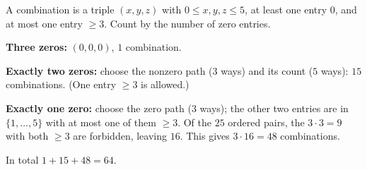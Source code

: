 A combination is a triple $(x,y,z)$ with $0\le x,y,z\le5$, at least one entry $0$, and at most one entry $\ge3$. Count by the number of zero entries.

\textbf{Three zeros:} $(0,0,0)$, $1$ combination.

\textbf{Exactly two zeros:} choose the nonzero path ($3$ ways) and its count ($5$ ways): $15$ combinations. (One entry $\ge3$ is allowed.)

\textbf{Exactly one zero:} choose the zero path ($3$ ways); the other two entries are in $\{1,\dots,5\}$ with at most one of them $\ge3$. Of the $25$ ordered pairs, the $3\cdot3=9$ with both $\ge3$ are forbidden, leaving $16$. This gives $3\cdot16=48$ combinations.

In total $1+15+48=\boxed{64}$.
